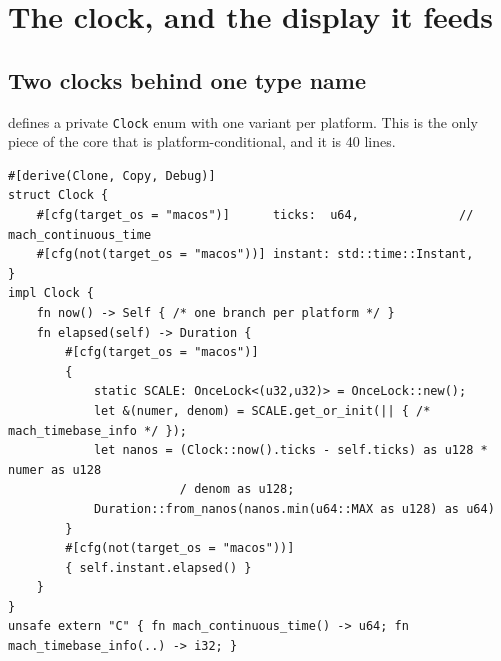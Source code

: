 \clearpage
\section{The clock, and the display it feeds}

\subsection{Two clocks behind one type name}

 defines a private \texttt{Clock} enum with one variant per platform.
This is the only piece of the core that is platform-conditional, and it is 40 lines.

\begin{lstlisting}[caption={\file{timer.rs} lines 4--59, abridged.}]
#[derive(Clone, Copy, Debug)]
struct Clock {
    #[cfg(target_os = "macos")]      ticks:  u64,              // mach_continuous_time
    #[cfg(not(target_os = "macos"))] instant: std::time::Instant,
}
impl Clock {
    fn now() -> Self { /* one branch per platform */ }
    fn elapsed(self) -> Duration {
        #[cfg(target_os = "macos")]
        {
            static SCALE: OnceLock<(u32,u32)> = OnceLock::new();
            let &(numer, denom) = SCALE.get_or_init(|| { /* mach_timebase_info */ });
            let nanos = (Clock::now().ticks - self.ticks) as u128 * numer as u128
                        / denom as u128;
            Duration::from_nanos(nanos.min(u64::MAX as u128) as u64)
        }
        #[cfg(not(target_os = "macos"))]
        { self.instant.elapsed() }
    }
}
unsafe extern "C" { fn mach_continuous_time() -> u64; fn mach_timebase_info(..) -> i32; }
\end{lstlisting}

